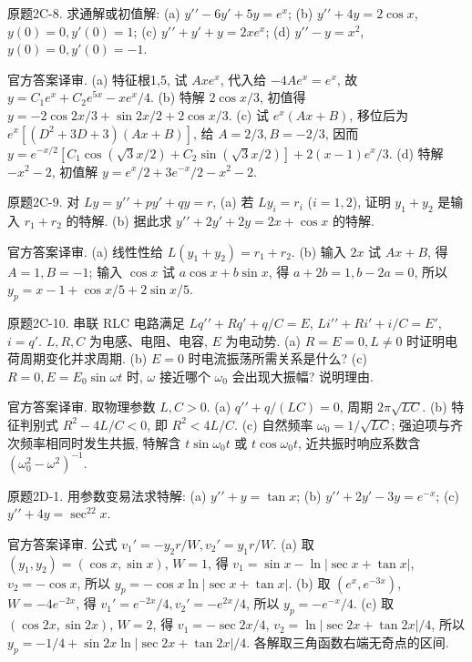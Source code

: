 \begin{exercise}\label{cw:bank-2C-8}
原题2C-8. 求通解或初值解: (a) $y\prime\prime-6y\prime+5y=e^x$; (b) $y\prime\prime+4y=2\cos x$, $y(0)=0,y\prime(0)=1$; (c) $y\prime\prime+y\prime+y=2xe^x$; (d) $y\prime\prime-y=x^2$, $y(0)=0,y\prime(0)=-1$.
\end{exercise}
\begin{solution}
官方答案译审. (a) 特征根1,5, 试 $Axe^x$, 代入给 $-4Ae^x=e^x$, 故 $y=C_1e^x+C_2e^{5x}-xe^x/4$. (b) 特解 $2\cos x/3$, 初值得 $y=-2\cos2x/3+\sin2x/2+2\cos x/3$. (c) 试 $e^x(Ax+B)$, 移位后为 $e^x[(D^2+3D+3)(Ax+B)]$, 给 $A=2/3,B=-2/3$, 因而 $y=e^{-x/2}[C_1\cos(\sqrt3x/2)+C_2\sin(\sqrt3x/2)]+2(x-1)e^x/3$. (d) 特解 $-x^2-2$, 初值解 $y=e^x/2+3e^{-x}/2-x^2-2$.
\end{solution}
\begin{exercise}\label{cw:bank-2C-9}
原题2C-9. 对 $Ly=y\prime\prime+py\prime+qy=r$, (a) 若 $Ly_i=r_i$ ($i=1,2$), 证明 $y_1+y_2$ 是输入 $r_1+r_2$ 的特解. (b) 据此求 $y\prime\prime+2y\prime+2y=2x+\cos x$ 的特解.
\end{exercise}
\begin{solution}
官方答案译审. (a) 线性性给 $L(y_1+y_2)=r_1+r_2$. (b) 输入 $2x$ 试 $Ax+B$, 得 $A=1,B=-1$; 输入 $\cos x$ 试 $a\cos x+b\sin x$, 得 $a+2b=1,b-2a=0$, 所以 $y_p=x-1+\cos x/5+2\sin x/5$.
\end{solution}
\begin{exercise}\label{cw:bank-2C-10}
原题2C-10. 串联 RLC 电路满足 $Lq\prime\prime+Rq\prime+q/C=E$, $Li\prime\prime+Ri\prime+i/C=E\prime$, $i=q\prime$. $L,R,C$ 为电感、电阻、电容, $E$ 为电动势. (a) $R=E=0,L\ne0$ 时证明电荷周期变化并求周期. (b) $E=0$ 时电流振荡所需关系是什么? (c) $R=0,E=E_0\sin\omega t$ 时, $\omega$ 接近哪个 $\omega_0$ 会出现大振幅? 说明理由.
\end{exercise}
\begin{solution}
官方答案译审. 取物理参数 $L,C>0$. (a) $q\prime\prime+q/(LC)=0$, 周期 $2\pi\sqrt{LC}$. (b) 特征判别式 $R^2-4L/C<0$, 即 $R^2<4L/C$. (c) 自然频率 $\omega_0=1/\sqrt{LC}$; 强迫项与齐次频率相同时发生共振, 特解含 $t\sin\omega_0t$ 或 $t\cos\omega_0t$, 近共振时响应系数含 $(\omega_0^2-\omega^2)^{-1}$.
\end{solution}
\begin{exercise}\label{cw:bank-2D-1}
原题2D-1. 用参数变易法求特解: (a) $y\prime\prime+y=\tan x$; (b) $y\prime\prime+2y\prime-3y=e^{-x}$; (c) $y\prime\prime+4y=\sec^22x$.
\end{exercise}
\begin{solution}
官方答案译审. 公式 $v_1\prime=-y_2r/W,v_2\prime=y_1r/W$. (a) 取 $(y_1,y_2)=(\cos x,\sin x)$, $W=1$, 得 $v_1=\sin x-\ln|\sec x+\tan x|$, $v_2=-\cos x$, 所以 $y_p=-\cos x\ln|\sec x+\tan x|$. (b) 取 $(e^x,e^{-3x})$, $W=-4e^{-2x}$, 得 $v_1\prime=e^{-2x}/4,v_2\prime=-e^{2x}/4$, 所以 $y_p=-e^{-x}/4$. (c) 取 $(\cos2x,\sin2x)$, $W=2$, 得 $v_1=-\sec2x/4$, $v_2=\ln|\sec2x+\tan2x|/4$, 所以 $y_p=-1/4+\sin2x\ln|\sec2x+\tan2x|/4$. 各解取三角函数右端无奇点的区间.
\end{solution}
